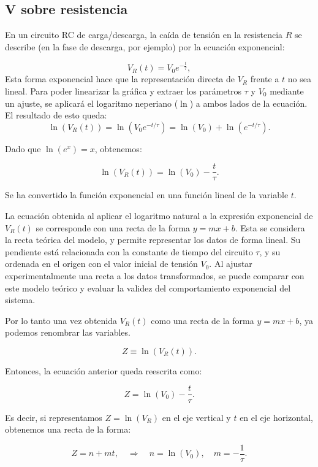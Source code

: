 \documentclass{article}
\begin{document}
\subsection{V sobre resistencia}
En un circuito RC de carga/descarga, la caída de tensión en la resistencia \( R \) se describe (en la fase de descarga, por ejemplo) por la ecuación exponencial:

\[
V_R(t) = V_0 e^{-\frac{t}{\tau}},
\]
Esta forma exponencial hace que la representación directa de \( V_R \) frente a \( t \) no sea lineal. Para poder linearizar la gráfica y extraer los parámetros \( \tau \) y \( V_0 \) mediante un ajuste, se aplicará el logaritmo neperiano (\( \ln \)) a ambos lados de la ecuación. El resultado de esto queda:
\[
\ln(V_R(t)) = \ln\left(V_0 e^{-t/\tau}\right) = \ln(V_0) + \ln\left(e^{-t/\tau}\right).
\]

Dado que \( \ln(e^x) = x \), obtenemos:

\[
\ln(V_R(t)) = \ln(V_0) - \frac{t}{\tau}.
\]

\noindent
Se ha convertido la función exponencial en una función lineal de la variable \( t \).

\vspace{2em}
\noindent
La ecuación obtenida al aplicar el logaritmo natural a la expresión exponencial de \( V_R(t) \) se corresponde con una recta de la forma \( y = mx + b \). Esta se considera la recta teórica del modelo, y permite representar los datos de forma lineal. Su pendiente está relacionada con la constante de tiempo del circuito \( \tau \), y su ordenada en el origen con el valor inicial de tensión \( V_0 \). Al ajustar experimentalmente una recta a los datos transformados, se puede comparar con este modelo teórico y evaluar la validez del comportamiento exponencial del sistema.

\vspace{2em}
Por lo tanto una vez obtenida \( V_R(t) \) como una recta de la forma \( y = mx + b \), ya podemos renombrar las variables.

\[
Z \equiv \ln(V_R(t)).
\]

Entonces, la ecuación anterior queda reescrita como:

\[
Z = \ln(V_0) - \frac{t}{\tau}.
\]

Es decir, si representamos \( Z = \ln(V_R) \) en el eje vertical y \( t \) en el eje horizontal, obtenemos una recta de la forma:

\[
Z = n + mt, \quad \Longrightarrow \quad n = \ln(V_0), \quad m = -\frac{1}{\tau}.
\]
\end{document}
